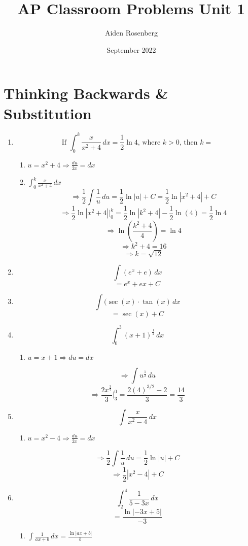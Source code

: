 \documentclass[12pt]{article}
\title{AP Classroom Problems Unit 1}
\author{Aiden Rosenberg}
\date{September 2022}
\begin{document}
\maketitle
\section{Thinking Backwards \& Substitution}
\begin{enumerate}
\item $$ \text{If } \int_{0}^{k} \frac{x}{x^2+4} \,dx=\frac{1}{2}\ln4 \text{, where } k>0 \text{, then } k=$$
\begin{enumerate}
    \item $u=x^2+4 \Longrightarrow \frac{du}{2x}= dx$
    \item $\int_{0}^{k} \frac{x}{x^2+4} \,dx$
$$\Longrightarrow \frac{1}{2} \int \frac{1}{u} \,du = \frac{1}{2}\ln|u|+C = \frac{1}{2} \ln|x^2+4| +C$$
$$\Longrightarrow \frac{1}{2} \ln|x^2+4| \bigg\rvert^{k}_{0}= \frac{1}{2}\ln|k^2+4|-\frac{1}{2}\ln(4)=\frac{1}{2}\ln4$$
$$\Longrightarrow \ln(\frac{k^2+4}{4})= \ln4$$
$$\Longrightarrow k^2+4 = 16 $$
$$\Longrightarrow k=\sqrt{12}$$
\end{enumerate}

\item $$ \int (e^x +e) \,dx$$
$$= e^x+ex +C$$

\item $$ \int (\sec(x)\cdot \tan(x) \,dx$$
$$= \sec(x)+C$$

\item $$\int_{0}^{3} (x+1)^{\frac{1}{2}} \,dx $$
\begin{enumerate}
    \item $u=x+1 \Longrightarrow du=dx$
\end{enumerate}
$$\Longrightarrow \int u^{\frac{1}{2}} \, du$$
$$\Longrightarrow \frac{2x^{\frac{3}{2}}}{3} \bigg\rvert^{0}_{3} = \frac{2(4)^{3/2}-2}{3}=\frac{14}{3}$$

\newpage
\item $$ \int \frac{x}{x^2-4} \,dx$$
\begin{enumerate}
    \item $u=x^2-4 \Longrightarrow \frac{du}{2x}=dx$
\end{enumerate}
$$\Longrightarrow \frac{1}{2} \int \frac{1}{u} \, du = \frac{1}{2}\ln|u| +C $$ 
$$\Longrightarrow \frac{1}{2}|x^2-4|+C$$

\item $$\int_{2}^{4} \frac{1}{5-3x} \,dx $$
$$= \frac{\ln|-3x+5|}{-3}$$
\begin{enumerate}
    \item $\int \frac{1}{ax+b} \, dx = \frac{\ln|ax+b|}{b}$
\end{enumerate}


\end{enumerate}
\end{document}
